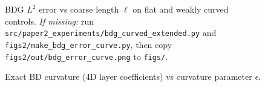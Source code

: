 \begin{figure}[t]
  \centering
  \caption{BDG $L^2$ error vs coarse length $\ell$ on flat and weakly curved controls.
  \emph{If missing:} run \texttt{src/paper2\_experiments/bdg\_curved\_extended.py} and \texttt{figs2/make\_bdg\_error\_curve.py}, then copy \texttt{figs2/out/bdg\_error\_curve.png} to \texttt{figs/}.}
\end{figure}

\begin{figure}[t]
  \centering
  \caption{Exact BD curvature (4D layer coefficients) vs curvature parameter $\epsilon$.}
\end{figure}

